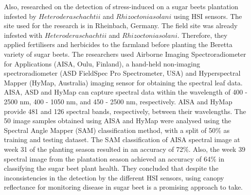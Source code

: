 \item Also, \cite{hillnhutter2011remote} researched on the detection of stress-induced on a sugar beets plantation infested by $Heterodera schachtii$ and $Rhizoctonia solani$ using HSI sensors. The site used for the research is in Rheinbach, Germany. The field site was already infested with $Heterodera schachtii$ and $Rhizoctonia solani$. Therefore, they applied fertilisers and herbicides to the farmland before planting the Beretta variety of sugar beets. The researchers used Airborne Imaging Spectroradiometer for Applications (AISA, Oulu, Finland), a hand-held non-imaging spectroradiometer (ASD FieldSpec Pro Spectrometer, USA) and Hyperspectral Mapper (HyMap, Australia) imaging sensor for obtaining the spectral leaf data. AISA, ASD and HyMap can capture spectral data within the wavelength of 400 - 2500 nm, 400 - 1050 nm, and 450 - 2500 nm, respectively. AISA and HyMap provide 481 and 126 spectral bands, respectively, between their wavelengths. The 50 image samples obtained using AISA and HyMap were analysed using the Spectral Angle Mapper (SAM) classification method, with a split of 50\% as training and testing dataset. The SAM classification of AISA spectral image at week 31 of the planting season resulted in an accuracy of 72\%. Also, the week 39 spectral image from the plantation season achieved an accuracy of 64\% in classifying the sugar beet plant health. They concluded that despite the inconsistencies in the detection by the different HSI sensors, using canopy reflectance for monitoring disease in sugar beet is a promising approach to take.




